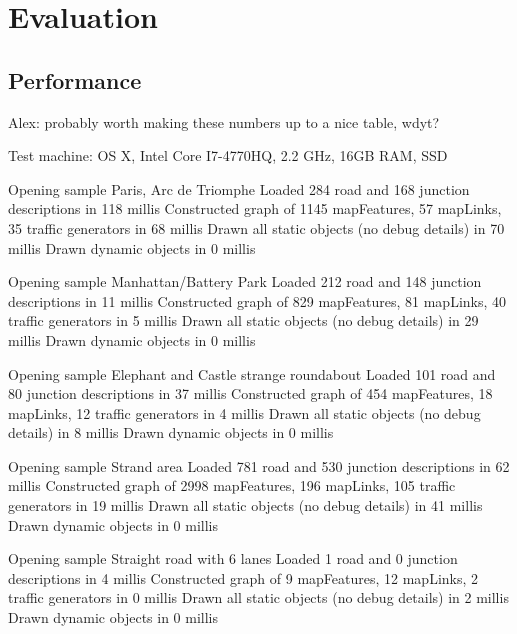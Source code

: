\section{Evaluation}

\subsection{Performance}

Alex: probably worth making these numbers up to a nice table, wdyt?

Test machine: OS X, Intel Core I7-4770HQ, 2.2 GHz, 16GB RAM, SSD

Opening sample Paris, Arc de Triomphe
Loaded 284 road and 168 junction descriptions in 118 millis
Constructed graph of 1145 mapFeatures, 57 mapLinks, 35 traffic generators in 68 millis
Drawn all static objects (no debug details) in 70 millis
Drawn dynamic objects in 0 millis

Opening sample Manhattan/Battery Park
Loaded 212 road and 148 junction descriptions in 11 millis
Constructed graph of 829 mapFeatures, 81 mapLinks, 40 traffic generators in 5 millis
Drawn all static objects (no debug details) in 29 millis
Drawn dynamic objects in 0 millis

Opening sample Elephant and Castle strange roundabout
Loaded 101 road and 80 junction descriptions in 37 millis
Constructed graph of 454 mapFeatures, 18 mapLinks, 12 traffic generators in 4 millis
Drawn all static objects (no debug details) in 8 millis
Drawn dynamic objects in 0 millis


Opening sample Strand area
Loaded 781 road and 530 junction descriptions in 62 millis
Constructed graph of 2998 mapFeatures, 196 mapLinks, 105 traffic generators in 19 millis
Drawn all static objects (no debug details) in 41 millis
Drawn dynamic objects in 0 millis


Opening sample Straight road with 6 lanes
Loaded 1 road and 0 junction descriptions in 4 millis
Constructed graph of 9 mapFeatures, 12 mapLinks, 2 traffic generators in 0 millis
Drawn all static objects (no debug details) in 2 millis
Drawn dynamic objects in 0 millis


